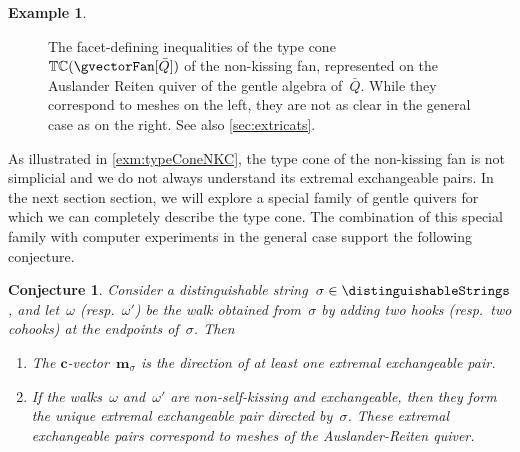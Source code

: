 \documentclass{amsart}
\newtheorem{conjecture}[theorem]{Conjecture}
\theoremstyle{definition}
\newtheorem{example}[theorem]{Example}
\renewcommand{\b}[1]{{\boldsymbol{#1}}} %
\newcommand{\multiplicityVector}{\b{m}} %
\newcommand{\typeCone}{\mathbb{TC}} %
\newcommand{\quiver}{\bar Q} %
\begin{document}
\begin{example}
\begin{figure}
\begin{adjustbox}{center}
    \end{adjustbox}
	\caption{The facet-defining inequalities of the type cone~$\typeCone(\gvectorFan[\quiver])$ of the non-kissing fan, represented on the Auslander Reiten quiver of the gentle algebra of~$\quiver$. While they correspond to meshes on the left, they are not as clear in the general case as on the right. See also \cref{sec:extricats}.}
	\label{fig:labelFacetDefiningInequalititiesNKC}
\end{figure}
\end{example}

As illustrated in \cref{exm:typeConeNKC}, the type cone of the non-kissing fan is not simplicial and we do not always understand its extremal exchangeable pairs.
In the next section section, we will explore a special family of gentle quivers for which we can completely describe the type cone.
The combination of this special family with computer experiments in the general case support the following conjecture.

\begin{conjecture}
Consider a distinguishable string~$\sigma \in \distinguishableStrings$, and let~$\omega$ (resp.~$\omega'$) be the walk obtained from~$\sigma$ by adding two hooks (resp.~two cohooks) at the endpoints of~$\sigma$. Then
\begin{enumerate}
\item The $\b{c}$-vector~$\multiplicityVector_\sigma$ is the direction of at least one extremal exchangeable pair.
\item If the walks~$\omega$ and~$\omega'$ are non-self-kissing and exchangeable, then they form the unique extremal exchangeable pair directed by~$\sigma$. These extremal exchangeable pairs correspond to meshes of the Auslander-Reiten quiver.
\end{enumerate}
\end{conjecture}
\end{document}
